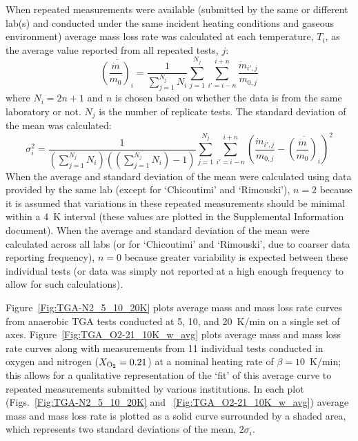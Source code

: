 \documentclass{book}
\begin{document}
When repeated measurements were available (submitted by the same or different lab(s) and conducted under the same incident heating conditions and gaseous environment) average mass loss rate was calculated at each temperature, $T_i$, as the average value reported from all repeated tests, $j$:
\begin{equation}
\overline{\left(\frac{\dot{m}}{m_0}\right)_i} = \frac{1}{\sum_{j=1}^{N_j}N_i} \sum_{j=1}^{N_j} \sum_{i'=i-n}^{i+n} \frac{\dot{m}_{i',j}}{m_{0,j}}
\end{equation}
where $N_i=2n+1$ and $n$ is chosen based on whether the data is from the same laboratory or not. $N_j$ is the number of replicate tests. The standard deviation of the mean was calculated:
\begin{equation}
  \sigma_i^2 = \frac{1}{(\sum_{j=1}^{N_j}N_i)((\sum_{j=1}^{N_j}N_i)-1)} \sum_{j=1}^{N_j} \sum_{i'=i-n}^{i+n}  \left( \frac{\dot{m}_{i',j}}{m_{0,j}} - \overline{\left(\frac{\dot{m}}{m_0}\right)_i} \right)^2
\end{equation}
When the average and standard deviation of the mean were calculated using data provided by the same lab (except for ‘Chicoutimi’ and ‘Rimouski’), $n=2$ because it is assumed that variations in these repeated measurements should be minimal within a 4~K interval (these values are plotted in the Supplemental Information document). When the average and standard deviation of the mean were calculated across all labs (or for ‘Chicoutimi’ and ‘Rimouski’, due to coarser data reporting frequency), $n=0$ because greater variability is expected between these individual tests (or data was simply not reported at a high enough frequency to allow for such calculations).

Figure~\ref{Fig:TGA-N2_5_10_20K} plots average mass and mass loss rate curves from anaerobic TGA tests conducted at 5, 10, and 20~K/min on a single set of axes. Figure~\ref{Fig:TGA_O2-21_10K_w_avg} plots average mass and mass loss rate curves along with measurements from 11 individual tests conducted in oxygen and nitrogen ($X_{\rm O_2}=0.21$) at a nominal heating rate of $\beta=10$~K/min; this allows for a qualitative representation of the ‘fit’ of this average curve to repeated measurements submitted by various institutions. In each plot (Figs.~\ref{Fig:TGA-N2_5_10_20K} and ~\ref{Fig:TGA_O2-21_10K_w_avg}) average mass and mass loss rate is plotted as a solid curve surrounded by a shaded area, which represents two standard deviations of the mean, $2 \sigma_i$.
\end{document}
